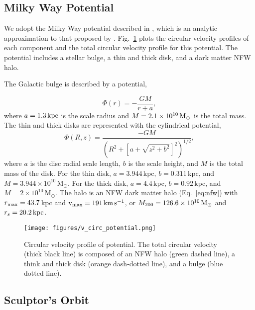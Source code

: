 \subsection{Milky Way Potential}\label{milky-way-potential}

We adopt the Milky Way potential described in \citet{EP2020}, which is
an analytic approximation to that proposed by \citet{mcmillan2011}.
Fig.~\ref{fig:v_circ_potential} plots the circular velocity profiles of
each component and the total circular velocity profile for this
potential. The potential includes a stellar bulge, a thin and thick
disk, and a dark matter NFW halo.

The Galactic bulge is described by a \citet{hernquist1990} potential,

\begin{equation}{
\Phi(r) = - \frac{GM}{r + a},
}\end{equation} where \(a=1.3\,{\rm kpc}\) is the scale radius and
\(M=2.1 \times 10^{10}\,{\rm M}_{\odot}\) is the total mass. The thin and thick
disks are represented with the \citet{miyamoto+nagai1975} cylindrical
potential, \begin{equation}{
\Phi(R, z) = \frac{-GM}{\left(R^2 + \left[a + \sqrt{z^2 + b^2}\right]^{2}\right)^{1/2}},
}\end{equation} where \(a\) is the disc radial scale length, \(b\) is
the scale height, and \(M\) is the total mass of the disk. For the thin
disk, \(a=3.944\,\)kpc, \(b=0.311\,\)kpc, and
\(M=3.944\times10^{10}\,\)M\(_\odot\). For the thick disk,
\(a=4.4\,\)kpc, \(b=0.92\,\)kpc, and \(M=2\times10^{10}\,\)M\(_\odot\).
The halo is an NFW dark matter halo (Eq.~\ref{eq:nfw}) with
\(r_{\rm max} = 43.7\,\)kpc and \({\rm v}_{\rm max} = 191\,{\rm km\,s^{-1}}\), or
\(M_{200} = 126.6\times 10^{10}\,{\rm M}_{\odot}\) and \(r_s=20.2\,{\rm kpc}\).

\begin{figure}
\centering
\texttt{[image: figures/v\_circ\_potential.png]}
\caption[Circular velocity of the Milky Way potential]{Circular velocity
profile of \citet{EP2020} potential. The total circular velocity (thick
black line) is composed of an NFW halo (green dashed line), a think and
thick \citet{miyamoto+nagai1975} disk (orange dash-dotted line), and a
\citet{hernquist1990} bulge (blue dotted
line).}\label{fig:v_circ_potential}
\end{figure}

\subsection{Sculptor's Orbit}\label{sculptors-orbit}

